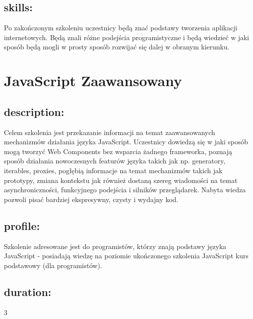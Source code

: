 \documentclass{article}[10pt]
\begin{document}
	\subsection*{skills:}
\begin{adjustwidth}{2cm}{}
	
Po zakończonym szkoleniu uczestnicy będą znać podstawy tworzenia aplikacji internetowych. Będą znali różne podejścia programistyczne i będą wiedzieć w jaki sposób będą mogli w prosty sposób rozwijać się dalej w obranym kierunku.

\end{adjustwidth}

\newpage


    
	\section{JavaScript Zaawansowany}

	\subsection*{description:}
	\begin{adjustwidth}{2cm}{}
		
Celem szkolenia jest przekazanie informacji na temat zaawansowanych mechanizmów działania języka JavaScript. Uczestnicy dowiedzą się w jaki sposób mogą tworzyć Web Components bez wsparcia żadnego frameworka, poznają sposób działania nowoczesnych featurów języka takich jak np. generatory, iterables, proxies, pogłębią informacje na temat mechanizmów takich jak prototypy, zmiana kontekstu jak również dostaną szereg wiadomości na temat asynchroniczności, funkcyjnego podejścia i silników przeglądarek. Nabyta wiedza pozwoli pisać bardziej ekspresywny, czysty i wydajny kod.
	\end{adjustwidth}
	\subsection*{profile:}
\begin{adjustwidth}{2cm}{}
	
Szkolenie adresowane jest do programistów, którzy znają podstawy języka JavaScript  - posiadają wiedzę na poziomie ukończonego szkolenia JavaScript kurs podstawowy (dla programistów).
\end{adjustwidth}
	\subsection*{duration:}
\begin{adjustwidth}{2cm}{}
	3
\end{adjustwidth}
\end{document}
